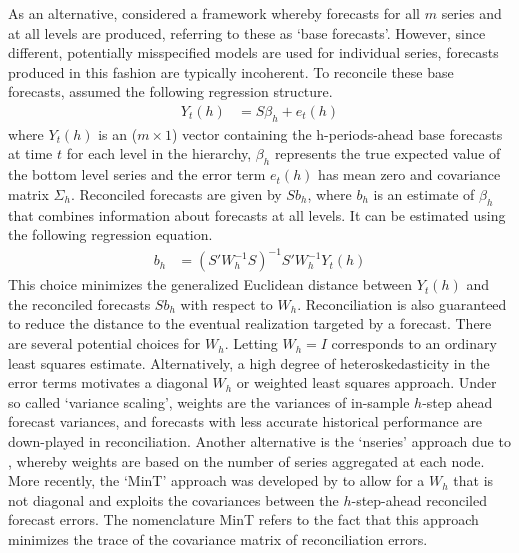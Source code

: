 \documentclass[a4paper,fleqn,11pt]{article}
\begin{document}
As an alternative, \cite{Hyndman2011} considered a framework whereby forecasts for all $m$ series and at all levels are produced, referring to these as `base forecasts'.  However, since different, potentially misspecified models are used for individual series, forecasts produced in this fashion are typically incoherent. To reconcile these base forecasts, \cite{Hyndman2011} assumed the following regression structure.
\begin{align}
	Y_t(h) &= S\beta_{h} + e_t(h)
	\label{eq:regstruct}
\end{align}
where $Y_t(h)$ is an ($m \times 1$) vector containing the h-periods-ahead base forecasts at time $t$ for each level in the hierarchy, $\beta_{h}$ represents the true expected value of the bottom level series and the error term $e_t(h)$ has mean zero and covariance matrix $\Sigma_h$. Reconciled forecasts are given by $Sb_{h}$, where $b_h$ is an estimate of $\beta_{h}$ that combines information about forecasts at all levels. It can be estimated using the following regression equation.
\begin{align}
	\label{eq:reg}
	b_{h} &= \left(S'W_h^{-1}S \right)^{-1} S'W_h^{-1}Y_t(h)
\end{align}
This choice minimizes the generalized Euclidean distance between $Y_t(h)$ and the reconciled forecasts $Sb_{h}$ with respect to $W_h$. Reconciliation is also guaranteed to reduce the distance to the eventual realization targeted by a forecast. There are several potential choices for $W_h$. Letting $W_h=I$ corresponds to an ordinary least squares estimate.  Alternatively, a high degree of heteroskedasticity in the error terms motivates a diagonal $W_h$ or weighted least squares approach. Under so called `variance scaling', weights are the variances of in-sample $h$-step ahead forecast variances, and forecasts with less accurate historical performance are down-played in reconciliation.  Another alternative is the `nseries' approach due to \cite{Athanasopoulos2017}, whereby weights are based on the number of series aggregated at each node.  More recently, the `MinT' approach was developed by \cite{Wickramasuriya2015} to allow for a $W_h$ that is not diagonal and exploits the covariances between the $h$-step-ahead reconciled forecast errors. The nomenclature MinT refers to the fact that this approach minimizes the trace of the covariance matrix of reconciliation errors.\\
\end{document}
